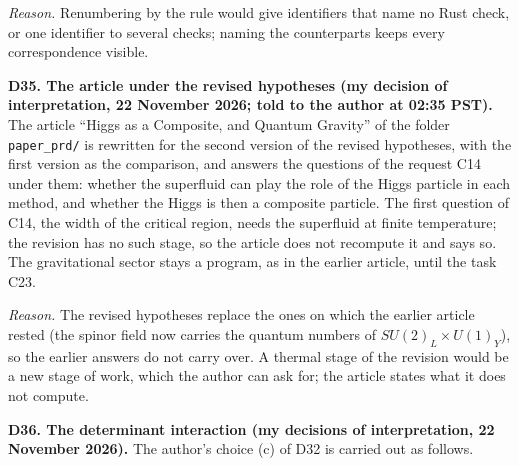 \documentclass[
  10pt,
]{article}
\begin{document}
\emph{Reason.} Renumbering by the rule would give identifiers that name
no Rust check, or one identifier to several checks; naming the
counterparts keeps every correspondence visible.

\textbf{D35. The article under the revised hypotheses (my decision of
interpretation, 22 November 2026; told to the author at 02:35 PST).} The
article ``Higgs as a Composite, and Quantum Gravity'' of the folder
\texttt{paper\_prd/} is rewritten for the second version of the revised
hypotheses, with the first version as the comparison, and answers the
questions of the request C14 under them: whether the superfluid can play
the role of the Higgs particle in each method, and whether the Higgs is
then a composite particle. The first question of C14, the width of the
critical region, needs the superfluid at finite temperature; the
revision has no such stage, so the article does not recompute it and
says so. The gravitational sector stays a program, as in the earlier
article, until the task C23.

\emph{Reason.} The revised hypotheses replace the ones on which the
earlier article rested (the spinor field now carries the quantum numbers
of \(SU(2)_L\times U(1)_Y\)), so the earlier answers do not carry over.
A thermal stage of the revision would be a new stage of work, which the
author can ask for; the article states what it does not compute.

\textbf{D36. The determinant interaction (my decisions of
interpretation, 22 November 2026).} The author's choice (c) of D32 is
carried out as follows.
\end{document}
